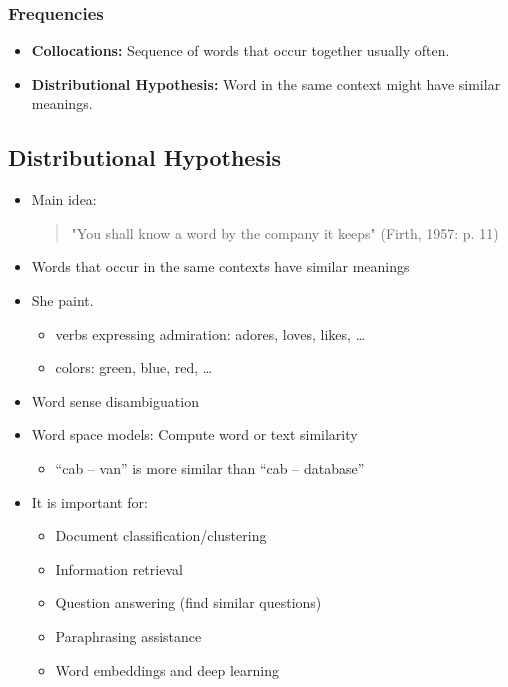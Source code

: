             \subsubsection{Frequencies} %
            	\begin{itemize}
            		\item \textbf{Collocations:} Sequence of words that occur together usually often.
            		\item \textbf{Distributional Hypothesis:} Word in the same context might have similar meanings.
            	\end{itemize}

		\subsection{Distributional Hypothesis}
			\begin{itemize}
				\item Main idea: \begin{quote}
					"You shall know a word by the company it keeps" (Firth, 1957: p. 11)
				\end{quote}
				\item Words that occur in the same contexts have similar meanings
				\item She   paint.
					\begin{itemize}
						\item verbs expressing admiration: adores, loves, likes, \dots 
						\item colors: green, blue, red, \dots 
					\end{itemize} 
				\item Word sense disambiguation
				\item Word space models: Compute word or text similarity
					\begin{itemize}
						\item \enquote{cab – van} is more similar than \enquote{cab – database}
					\end{itemize}
				\item It is important for:
					\begin{itemize}
						\item Document classification/clustering
						\item Information retrieval
						\item Question answering (find similar questions)
						\item Paraphrasing assistance
						\item Word embeddings and deep learning
					\end{itemize}
			\end{itemize}

